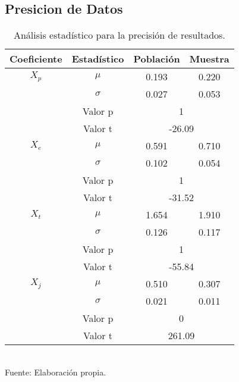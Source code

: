 \documentclass[12pt]{article} %
\begin{document}
\subsection{Presicion de Datos} \label{sec:Precision}

\begin{table}[H]
    \caption{Análisis estadístico para la precisión de resultados.}
    \vspace{0.2cm}
    \centering
    \begin{tabular}{|c|c|c|c|}
    \hline
    \textbf{Coeficiente} & \textbf{Estadístico} & \textbf{Población} & \textbf{Muestra} \\ \hline
    $X_p$ & \multicolumn{1}{|c|}{\(\mu\)} & 0.193 & 0.220 \\ \cline{2-4}
    & \multicolumn{1}{|c|}{\(\sigma\)} & 0.027 & 0.053 \\ \cline{2-4}
    & \multicolumn{1}{|c|}{Valor p} & \multicolumn{2}{|c|}{1} \\ \cline{2-4}
    & \multicolumn{1}{|c|}{Valor t} & \multicolumn{2}{|c|}{-26.09} \\ \hline
    
    $X_e$ & \multicolumn{1}{|c|}{\(\mu\)} & 0.591 & 0.710 \\ \cline{2-4}
    & \multicolumn{1}{|c|}{\(\sigma\)} & 0.102 & 0.054 \\ \cline{2-4}
    & \multicolumn{1}{|c|}{Valor p} & \multicolumn{2}{|c|}{1} \\ \cline{2-4}
    & \multicolumn{1}{|c|}{Valor t} & \multicolumn{2}{|c|}{-31.52} \\ \hline
    
    $X_t$ & \multicolumn{1}{|c|}{\(\mu\)} & 1.654 & 1.910 \\ \cline{2-4}
    & \multicolumn{1}{|c|}{\(\sigma\)} & 0.126 & 0.117 \\ \cline{2-4}
    & \multicolumn{1}{|c|}{Valor p} & \multicolumn{2}{|c|}{1} \\ \cline{2-4}
    & \multicolumn{1}{|c|}{Valor t} & \multicolumn{2}{|c|}{-55.84} \\ \hline
    
    $X_j$ & \multicolumn{1}{|c|}{\(\mu\)} & 0.510 & 0.307 \\ \cline{2-4}
    & \multicolumn{1}{|c|}{\(\sigma\)} & 0.021 & 0.011 \\ \cline{2-4}
    & \multicolumn{1}{|c|}{Valor p} & \multicolumn{2}{|c|}{0} \\ \cline{2-4}
    & \multicolumn{1}{|c|}{Valor t} & \multicolumn{2}{|c|}{261.09} \\ \hline
    \end{tabular}
    \label{Precision_Resultados}
    \vspace{0.2cm}
    \\Fuente: Elaboración propia.
\end{table}
\end{document}
